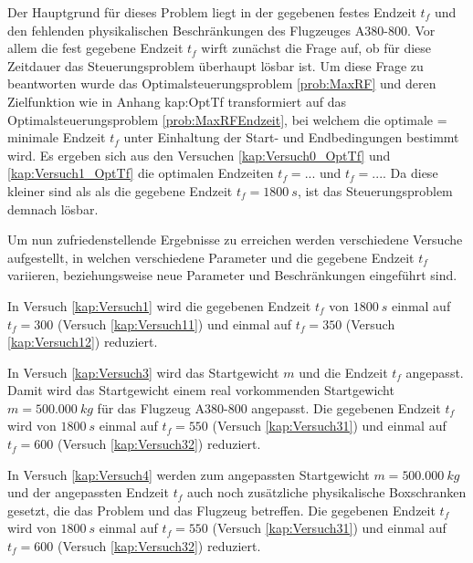 Der Hauptgrund für dieses Problem liegt in der gegebenen festes Endzeit $t_f$ und den fehlenden physikalischen Beschränkungen des Flugzeuges A380-800. Vor allem die fest gegebene Endzeit $t_f$ wirft zunächst die Frage auf, ob für diese Zeitdauer das Steuerungsproblem überhaupt lösbar ist. Um diese Frage zu beantworten wurde das Optimalsteuerungsproblem \ref{prob:MaxRF} und deren Zielfunktion wie in Anhang {kap:OptTf} transformiert auf das Optimalsteuerungsproblem \ref{prob:MaxRFEndzeit}, bei welchem die optimale = minimale Endzeit $t_f$ unter Einhaltung der Start- und Endbedingungen bestimmt wird. Es ergeben sich aus den Versuchen \ref{kap:Versuch0_OptTf} und \ref{kap:Versuch1_OptTf} die optimalen Endzeiten $t_f = ...$ und $t_f = ...$. Da diese kleiner sind als als die gegebene Endzeit $t_f = 1800 \ s$, ist das Steuerungsproblem demnach lösbar.

Um nun zufriedenstellende Ergebnisse zu erreichen werden verschiedene Versuche aufgestellt, in welchen verschiedene Parameter und die gegebene Endzeit $t_f$ variieren, beziehungsweise neue Parameter und Beschränkungen eingeführt sind. 

In Versuch \ref{kap:Versuch1} wird die gegebenen Endzeit $t_f$ von $1800 \ s$ einmal auf $t_f = 300$ (Versuch \ref{kap:Versuch11}) und einmal auf $t_f = 350$ (Versuch \ref{kap:Versuch12}) reduziert. 

In Versuch \ref{kap:Versuch3} wird das Startgewicht $m$ und die Endzeit $t_f$ angepasst. Damit wird das Startgewicht einem real vorkommenden Startgewicht $m = 500.000 \ kg$ für das Flugzeug A380-800 angepasst. Die gegebenen Endzeit $t_f$ wird von $1800 \ s$ einmal auf $t_f = 550$ (Versuch \ref{kap:Versuch31}) und einmal auf $t_f = 600$ (Versuch \ref{kap:Versuch32}) reduziert. 

In Versuch \ref{kap:Versuch4} werden zum angepassten Startgewicht $m = 500.000 \ kg$ und der angepassten Endzeit $t_f$ auch noch zusätzliche physikalische Boxschranken gesetzt, die das Problem und das Flugzeug betreffen. Die gegebenen Endzeit $t_f$ wird von $1800 \ s$ einmal auf $t_f = 550$ (Versuch \ref{kap:Versuch31}) und einmal auf $t_f = 600$ (Versuch \ref{kap:Versuch32}) reduziert.








%
%
%
%
%



